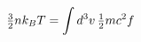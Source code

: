 \documentclass[preview]{standalone}
\begin{document}
\begin{align*}
\special{dvisvgm:raw <g id='unique000'>}\tfrac32 nk_BT=\int d^3v\,\tfrac12 mc^2 f\special{dvisvgm:raw </g>}
\end{align*}
\end{document}
